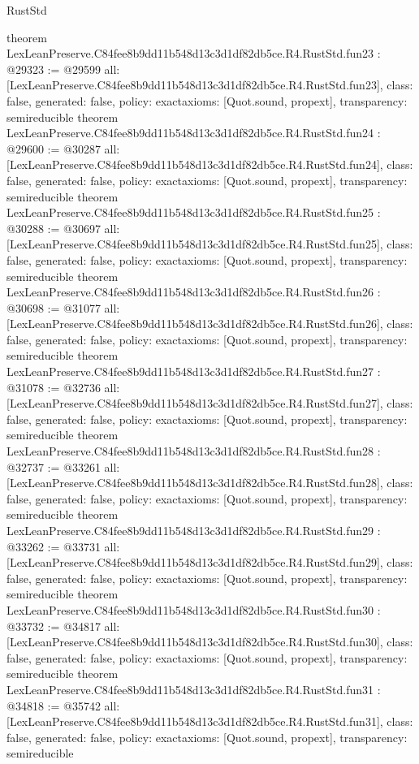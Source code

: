 \begin{lexlean}{RustStd}
\begin{coremodule}
{}
theorem LexLeanPreserve.C84fee8b9dd11b548d13c3d1df82db5ce.R4.RustStd.fun23 : @29323 := @29599 {
  all: [LexLeanPreserve.C84fee8b9dd11b548d13c3d1df82db5ce.R4.RustStd.fun23],
  class: false,
  generated: false,
  policy: exact{axioms: [Quot.sound, propext]},
  transparency: semireducible
}
theorem LexLeanPreserve.C84fee8b9dd11b548d13c3d1df82db5ce.R4.RustStd.fun24 : @29600 := @30287 {
  all: [LexLeanPreserve.C84fee8b9dd11b548d13c3d1df82db5ce.R4.RustStd.fun24],
  class: false,
  generated: false,
  policy: exact{axioms: [Quot.sound, propext]},
  transparency: semireducible
}
theorem LexLeanPreserve.C84fee8b9dd11b548d13c3d1df82db5ce.R4.RustStd.fun25 : @30288 := @30697 {
  all: [LexLeanPreserve.C84fee8b9dd11b548d13c3d1df82db5ce.R4.RustStd.fun25],
  class: false,
  generated: false,
  policy: exact{axioms: [Quot.sound, propext]},
  transparency: semireducible
}
theorem LexLeanPreserve.C84fee8b9dd11b548d13c3d1df82db5ce.R4.RustStd.fun26 : @30698 := @31077 {
  all: [LexLeanPreserve.C84fee8b9dd11b548d13c3d1df82db5ce.R4.RustStd.fun26],
  class: false,
  generated: false,
  policy: exact{axioms: [Quot.sound, propext]},
  transparency: semireducible
}
theorem LexLeanPreserve.C84fee8b9dd11b548d13c3d1df82db5ce.R4.RustStd.fun27 : @31078 := @32736 {
  all: [LexLeanPreserve.C84fee8b9dd11b548d13c3d1df82db5ce.R4.RustStd.fun27],
  class: false,
  generated: false,
  policy: exact{axioms: [Quot.sound, propext]},
  transparency: semireducible
}
theorem LexLeanPreserve.C84fee8b9dd11b548d13c3d1df82db5ce.R4.RustStd.fun28 : @32737 := @33261 {
  all: [LexLeanPreserve.C84fee8b9dd11b548d13c3d1df82db5ce.R4.RustStd.fun28],
  class: false,
  generated: false,
  policy: exact{axioms: [Quot.sound, propext]},
  transparency: semireducible
}
theorem LexLeanPreserve.C84fee8b9dd11b548d13c3d1df82db5ce.R4.RustStd.fun29 : @33262 := @33731 {
  all: [LexLeanPreserve.C84fee8b9dd11b548d13c3d1df82db5ce.R4.RustStd.fun29],
  class: false,
  generated: false,
  policy: exact{axioms: [Quot.sound, propext]},
  transparency: semireducible
}
theorem LexLeanPreserve.C84fee8b9dd11b548d13c3d1df82db5ce.R4.RustStd.fun30 : @33732 := @34817 {
  all: [LexLeanPreserve.C84fee8b9dd11b548d13c3d1df82db5ce.R4.RustStd.fun30],
  class: false,
  generated: false,
  policy: exact{axioms: [Quot.sound, propext]},
  transparency: semireducible
}
theorem LexLeanPreserve.C84fee8b9dd11b548d13c3d1df82db5ce.R4.RustStd.fun31 : @34818 := @35742 {
  all: [LexLeanPreserve.C84fee8b9dd11b548d13c3d1df82db5ce.R4.RustStd.fun31],
  class: false,
  generated: false,
  policy: exact{axioms: [Quot.sound, propext]},
  transparency: semireducible
}
\end{coremodule}
\end{lexlean}
